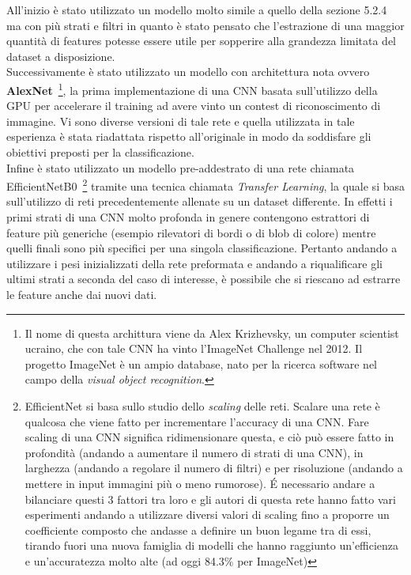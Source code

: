 All'inizio è stato utilizzato un modello molto simile a quello della sezione 5.2.4 
ma con più strati e filtri in quanto è stato pensato che l'estrazione di una maggior quantità di features potesse essere utile per sopperire alla grandezza limitata del dataset a disposizione.\\ 
Successivamente è stato utilizzato un modello con architettura  nota ovvero \textbf{AlexNet}~\cite{alexnet}\footnote{Il nome di questa archittura viene da Alex Krizhevsky, un computer scientist ucraino, che con tale CNN ha vinto l'ImageNet Challenge nel 2012. Il progetto ImageNet è un ampio database, nato per la ricerca software nel campo della \emph{visual object recognition}. }, la prima implementazione di una CNN basata sull'utilizzo della GPU per accelerare il training ad avere vinto un contest di riconoscimento di immagine. Vi sono diverse versioni di tale rete e quella utilizzata in tale esperienza è stata riadattata rispetto all'originale in modo da soddisfare gli obiettivi preposti per la classificazione. \\
Infine è stato utilizzato un modello pre-addestrato di una rete chiamata EfficientNetB0~\cite{effnet}\footnote{EfficientNet
 si basa sullo studio dello \emph{scaling} delle reti. Scalare una rete è qualcosa che viene fatto per 
incrementare l'accuracy di una CNN. Fare scaling di una CNN significa ridimensionare questa, e ciò può essere fatto
in profondità (andando a aumentare il numero di strati di una CNN), in larghezza (andando a regolare il numero di filtri)
 e per risoluzione (andando a mettere in input immagini più o meno rumorose). É necessario andare a bilanciare
questi 3 fattori tra loro e gli autori di questa rete hanno fatto vari esperimenti andando a utilizzare
diversi valori di scaling fino a proporre un coefficiente composto che andasse a definire 
un buon legame tra di essi, tirando fuori una nuova famiglia di modelli che hanno raggiunto un'efficienza e un'accuratezza molto alte (ad oggi 84.3$\%$ per ImageNet)} tramite una tecnica chiamata \emph{Transfer Learning}, la quale si basa sull'utilizzo di reti precedentemente allenate su un dataset differente. In effetti i primi strati di una CNN molto profonda in genere contengono estrattori di feature più generiche (esempio rilevatori di bordi o di blob di colore) mentre quelli finali sono più specifici per una singola classificazione. Pertanto andando a utilizzare i pesi inizializzati della rete preformata e andando a riqualificare gli ultimi strati a seconda del caso di interesse, è possibile che si riescano ad estrarre le feature anche dai nuovi dati. 

